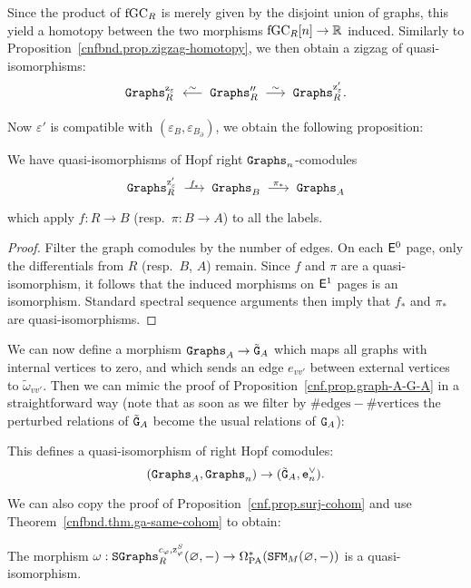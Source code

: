 Since the product of $\mathrm{fGC}_{R}$ is merely given by the disjoint union of graphs, this yield a homotopy between the two morphisms $\mathrm{fGC}_{R}[n] \to \mathbb{R}$ induced.
Similarly to Proposition~\ref{cnfbnd.prop.zigzag-homotopy}, we then obtain a zigzag of quasi-isomorphisms:
\begin{equation}
  \Graphs^{\ze}_{R} \qiso* \Graphs''_{R} \qiso \Graphs^{\ze'}_{R}.
\end{equation}

Now $\varepsilon'$ is compatible with $(\varepsilon_{B}, \varepsilon_{B_{\partial}})$, we obtain the following proposition:

\begin{proposition}
  We have quasi-isomorphisms of Hopf right $\mathtt{Graphs}_{n}$-comodules
  \[ \Graphs_{R}^{\ze'} \tkrightarrow{f_{*}} \Graphs_{B} \tkrightarrow{\pi_{*}} \Graphs_{A} \]
  which apply $f : R \to B$ (resp.\ $\pi : B \to A$) to all the labels.
\end{proposition}
\begin{proof}
  Filter the graph comodules by the number of edges.
  On each $\mathsf{E}^{0}$ page, only the differentials from $R$ (resp.\ $B$, $A$) remain.
  Since $f$ and $\pi$ are a quasi-isomorphism, it follows that the induced morphisms on $\mathsf{E}^{1}$ pages is an isomorphism.
  Standard spectral sequence arguments then imply that $f_{*}$ and $\pi_{*}$ are quasi-iso\-mor\-phisms.
\end{proof}

We can now define a morphism $\mathtt{Graphs}_{A} \to \tilde{\mathtt{G}}_{A}$ which maps all graphs with internal vertices to zero, and which sends an edge $e_{vv'}$ between external vertices to $\tilde{\omega}_{vv'}$.
Then we can mimic the proof of Proposition~\ref{cnf.prop.graph-A-G-A} in a straightforward way (note that as soon as we filter by $\# \text{edges} - \# \text{vertices}$ the perturbed relations of $\tilde{\mathtt{G}}_{A}$ become the usual relations of $\mathtt{G}_{A}$):
\begin{proposition}
  \label{cnfbnd.qiso-graphs-ga}
  This defines a quasi-isomorphism of right Hopf comodules:
  \[ (\mathtt{Graphs}_{A}, \mathtt{Graphs}_{n}) \to (\tilde{\mathtt{G}}_{A}, \mathtt{e}_{n}^{\vee}). \]
\end{proposition}

We can also copy the proof of Proposition~\ref{cnf.prop.surj-cohom} and use Theorem~\ref{cnfbnd.thm.ga-same-cohom} to obtain:
\begin{proposition}
  The morphism $\omega : \mathtt{SGraphs}^{c_{\varphi}, \mathrm{z}^{S}_{\varphi}}_{R}(\varnothing, -) \to \Omega_{\mathrm{PA}}^{*}(\mathtt{SFM}_{M}(\varnothing, -))$ is a quasi-isomorphism.
\end{proposition}

